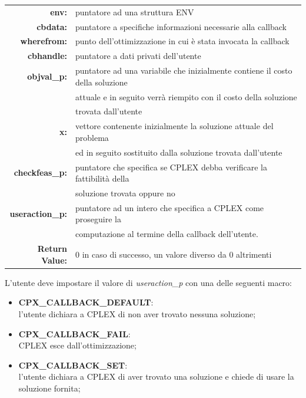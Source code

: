 \begin{table}[h]
\centering
\begin{tabular}{rl}
\textbf{env:} & {puntatore ad una struttura ENV}\\
\textbf{cbdata:} & {puntatore a specifiche informazioni necessarie alla callback}\\
\textbf{wherefrom:} & {punto dell'ottimizzazione in cui è stata invocata la callback} \\ 
\textbf{cbhandle:} & {puntatore a dati privati dell'utente}\\
\textbf{objval\_p:} & {puntatore ad una variabile che inizialmente contiene il costo della soluzione}\\
&{attuale e in seguito verrà riempito con il costo della soluzione}\\
&{trovata dall'utente}\\
\textbf{x:} & {vettore contenente inizialmente la soluzione attuale del problema}\\
&{ed in seguito sostituito dalla soluzione trovata dall'utente}\\
\textbf{checkfeas\_p:} & {puntatore che specifica se CPLEX debba verificare la fattibilità della}\\
&{soluzione trovata oppure no}\\
\textbf{useraction\_p:} & {puntatore ad un intero che specifica a CPLEX come proseguire la }\\
&{computazione al termine della callback dell'utente.}\\
\textbf{Return Value:} & {0 in caso di successo, un valore diverso da 0 altrimenti}\\
\end{tabular}
\end{table}

L'utente deve impostare il valore di \textit{useraction\_p} con una delle seguenti macro:
\begin{itemize}
\item{\textbf{CPX\_CALLBACK\_DEFAULT}:\\
l'utente dichiara a CPLEX di non aver trovato nessuna soluzione;}
\item{\textbf{CPX\_CALLBACK\_FAIL}:\\
CPLEX esce dall'ottimizzazione;}
\item{\textbf{CPX\_CALLBACK\_SET}:\\
l'utente dichiara a CPLEX di aver trovato una soluzione e chiede di usare la soluzione fornita;}
\end{itemize}

